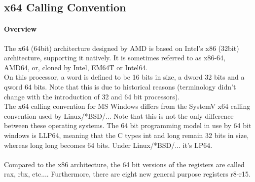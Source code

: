 %
%
%
%

\subsection{x64 Calling Convention}


\paragraph{Overview}

The x64 (64bit) architecture designed by AMD is based on Intel's x86 (32bit)
architecture, supporting it natively. It is sometimes referred to as x86-64,
AMD64, or, cloned by Intel, EM64T or Intel64.\\
On this processor, a word is defined to be 16 bits in size, a dword 32 bits
and a qword 64 bits. Note that this is due to historical reasons (terminology
didn't change with the introduction of 32 and 64 bit processors).\\
The x64 calling convention for MS Windows \cite{x64Win} differs from the
SystemV x64 calling convention \cite{x64SysV} used by Linux/*BSD/...
Note that this is not the only difference between these operating systems. The
64 bit programming model in use by 64 bit windows is LLP64, meaning that the C
types int and long remain 32 bits in size, whereas long long becomes 64 bits.
Under Linux/*BSD/... it's LP64.\\
\\
Compared to the x86 architecture, the 64 bit versions of the registers are
called rax, rbx, etc.... Furthermore, there are eight new general purpose
registers r8-r15.



